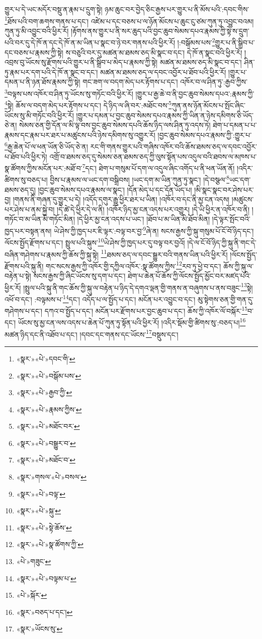 གྱུར་པ་དེ་ཡང་མདོར་བསྡུ་ན་རྣམ་པ་དྲུག་སྟེ། ཉམ་ཆུང་བར་བྱེད་ཅིང་རྒྱས་པར་གྱུར་པ་ནི་མོས་པའི་:དབང་གིས་\footnote{«སྣར་»«པེ་»དབང་གི་}ཐོས་པའི་བག་ཆགས་གནས་པ་དང་། འཛེམ་པ་དང་བཅས་པ་ལ་ཉོན་མོངས་པ་ཆུང་ངུ་ཙམ་ཀུན་ཏུ་འབྱུང་བའམ། ཀུན་ཏུ་མི་འབྱུང་བའི་ཕྱིར་རོ། །རྟོགས་ནས་གྱུར་པ་ནི་སར་ཆུད་པའི་བྱང་ཆུབ་སེམས་དཔའ་རྣམས་ཀྱི་སྟེ་ས་དྲུག་པའི་བར་དུ་དེ་ཁོ་ན་དང་དེ་ཁོ་ན་མ་ཡིན་པ་སྣང་བ་ཉེ་བར་གནས་པའི་ཕྱིར་རོ། །:བསྒོམས་པས་\footnote{«སྣར་»«པེ་»བསྒོམ་པས་}གྱུར་པ་ནི་སྒྲིབ་པ་དང་བཅས་པ་རྣམས་ཀྱི་སྟེ། ས་བཅུའི་བར་དུ་མཚན་མ་ཐམས་ཅད་མི་སྣང་བ་དང་། དེ་ཁོ་ན་སྣང་བའི་ཕྱིར་རོ། །འབྲས་བུ་ཡོངས་སུ་རྫོགས་པའི་གྱུར་པ་ནི་སྒྲིབ་པ་མེད་པ་རྣམས་ཀྱི་སྟེ། མཚན་མ་ཐམས་ཅད་མི་སྣང་བ་དང་། ཤིན་ཏུ་རྣམ་པར་དག་པའི་དེ་ཁོ་ན་སྣང་བ་དང་། མཚན་མ་ཐམས་ཅད་ལ་དབང་འབྱོར་པ་ཐོབ་པའི་ཕྱིར་རོ། །གྱུར་པ་དམན་པ་ནི་ཉན་ཐོས་རྣམས་ཀྱི་སྟེ། གང་ཟག་ལ་བདག་མེད་པར་རྟོགས་པ་དང་། འཁོར་བ་ལ་ཤིན་ཏུ་:རྒྱབ་ཀྱིས་\footnote{«སྣར་»«པེ་»རྒྱབ་ཀྱི་}བལྟས་པས་འཁོར་བ་ཤིན་ཏུ་ཡོངས་སུ་གཏོང་བའི་ཕྱིར་རོ། །གྱུར་པ་རྒྱ་ཆེ་བ་ནི་བྱང་ཆུབ་སེམས་དཔའ་:རྣམས་ཀྱི་\footnote{«སྣར་»«པེ་»རྣམས་ཀྱིས་}སྟེ། ཆོས་ལ་བདག་མེད་པར་རྟོགས་པ་དང་། དེ་ཉིད་ལ་ཞི་བར་:མཐོང་བས་\footnote{«སྣར་»«པེ་»མཐོང་བར་}ཀུན་ནས་ཉོན་མོངས་པ་སྤོང་ཞིང་ཡོངས་སུ་མི་གཏོང་བའི་ཕྱིར་རོ། །གྱུར་པ་དམན་པ་བྱང་ཆུབ་སེམས་དཔའ་རྣམས་ཀྱི་ཡིན་ན་ཉེས་དམིགས་ཅི་ཡོད་ཅེ་ན། སེམས་ཅན་གྱི་དོན་ལ་མི་ལྟ་བས་བྱང་ཆུབ་སེམས་དཔའི་ཆོས་ཉིད་ལས་ཤིན་ཏུ་འདས་ཏེ། ཐེག་པ་དམན་པ་པ་རྣམས་དང་རྣམ་པར་ཐར་པ་མཚུངས་པའི་ཉེས་དམིགས་སུ་འགྱུར་རོ། །བྱང་ཆུབ་སེམས་དཔའ་རྣམས་ཀྱི་:གྱུར་པ་\footnote{«སྣར་»«པེ་»བསྒྱུར་བ་}རྒྱ་ཆེན་པོ་ལ་ཕན་ཡོན་ཅི་ཡོད་ཅེ་ན། རང་གི་གནས་གྱུར་པའི་གཞིས་འཁོར་བའི་ཆོས་ཐམས་ཅད་ལ་དབང་འབྱོར་པ་ཐོབ་པའི་ཕྱིར་ཏེ། འགྲོ་བ་ཐམས་ཅད་དུ་སེམས་ཅན་ཐམས་ཅད་ཀྱི་ལུས་སྟོན་པས་འདུལ་བའི་ཐབས་ལ་མཁས་པ་སྣ་ཚོགས་ཀྱིས་མངོན་པར་:མཐོ་བ་\footnote{«སྣར་»«པེ་»མཐོང་བ་}དང་། ཐེག་པ་གསུམ་པོ་དག་ལ་འདུལ་ཞིང་འགོད་པ་ནི་ཕན་ཡོན་ནོ། །འདིར་ཚིགས་སུ་བཅད་པ། བྱིས་པ་རྣམས་ལ་ཡང་དག་བསྒྲིབས། །ཡང་དག་མ་ཡིན་ཀུན་ཏུ་སྣང་། །དེ་བསྩལ་\footnote{«སྣར་»གསལ་«པེ་»བསལ་}ཡང་དག་ཐམས་ཅད་དུ། །བྱང་ཆུབ་སེམས་དཔའ་རྣམས་ལ་སྣང་། །དོན་མེད་པ་དང་དོན་ཡོད་པ། །མི་སྣང་སྣང་བར་ཤེས་པར་བྱ། །གནས་ནི་གཞན་དུ་གྱུར་པ་དེ། །འདོད་དགུར་རྒྱུ་ཕྱིར་ཐར་པ་ཡིན། །འཁོར་བ་དང་ནི་མྱ་ངན་འདས། །མཚུངས་པར་ཤེས་པ་ནམ་སྐྱེ་བ། །དེ་ཚེ་དེ་ཕྱིར་དེ་ལ་ནི། །འཁོར་ཉིད་མྱ་ངན་འདས་པར་འགྱུར། །དེ་ཡི་ཕྱིར་ན་འཁོར་བ་ནི། །གཏོང་བ་མ་ཡིན་མི་གཏོང་མིན། །དེ་ཕྱིར་མྱ་ངན་འདས་པ་ཡང་། །ཐོབ་པ་མ་ཡིན་མི་ཐོབ་མིན། །དེ་ལྟར་སྤོང་བའི་ཁྱད་པར་བསྟན་ནས། ཡེ་ཤེས་ཀྱི་ཁྱད་པར་ཇི་ལྟར་:བལྟ་བར་བྱ་\footnote{«སྣར་»«པེ་»བལྟ་}ཞེ་ན། སངས་རྒྱས་ཀྱི་སྐུ་གསུམ་པོ་ངོ་བོ་ཉིད་དང་། ལོངས་སྤྱོད་རྫོགས་པ་དང་། སྤྲུལ་པའི་སྐུས་\footnote{«སྣར་»«པེ་»སྐུ་}ཡེ་ཤེས་ཀྱི་ཁྱད་པར་དུ་བལྟ་བར་བྱའོ། །དེ་ལ་ངོ་བོ་ཉིད་ཀྱི་སྐུ་ནི་གང་དེ་བཞིན་གཤེགས་པ་རྣམས་ཀྱི་ཆོས་ཀྱི་སྐུ་སྟེ། \footnote{«སྣར་»«པེ་»སྟེ་ཆོས་}ཐམས་ཅད་ལ་དབང་སྒྱུར་བའི་གནས་ཡིན་པའི་ཕྱིར་རོ། །ལོངས་སྤྱོད་རྫོགས་པའི་སྐུ་ནི། གང་སངས་རྒྱས་ཀྱི་འཁོར་གྱི་དཀྱིལ་འཁོར་:སྣ་ཚོགས་ཀྱིས་\footnote{«སྣར་»«པེ་»སྣ་ཚོགས་ཀྱི་}རབ་ཏུ་ཕྱེ་བ་དང་། ཆོས་ཀྱི་སྐུ་ལ་བརྟེན་པ་སྟེ། སངས་རྒྱས་ཀྱི་ཞིང་ཡོངས་སུ་དག་པ་དང་། ཐེག་པ་ཆེན་པོ་ཆོས་ཀྱི་ལོངས་སྤྱོད་མྱོང་བར་མཛད་པའི་ཕྱིར་རོ། །སྤྲུལ་པའི་སྐུ་ནི་གང་ཆོས་ཀྱི་སྐུ་ལ་བརྟེན་པ་ཉིད་དེ་དགའ་ལྡན་གྱི་གནས་ན་བཞུགས་པ་ནས་བཟུང་\footnote{«པེ་»གཟུང་}སྟེ། འཕོ་བ་དང་། :བལྟམས་པ་\footnote{«སྣར་»«པེ་»བལྟམ་པ་}དང་། འདོད་པ་ལ་སྤྱོད་པ་དང་། མངོན་པར་འབྱུང་བ་དང་། མུ་སྟེགས་ཅན་གྱི་གན་དུ་གཤེགས་པ་དང་། དཀའ་བ་སྤྱོད་པ་དང་། མངོན་པར་རྫོགས་པར་བྱང་ཆུབ་པ་དང་། ཆོས་ཀྱི་འཁོར་ལོ་བསྐོར་\footnote{«པེ་»སྐོར་}བ་དང་། ཡོངས་སུ་མྱ་ངན་ལས་འདས་པ་ཆེན་པོ་ཀུན་ཏུ་སྟོན་པའི་ཕྱིར་རོ། །འདིར་སྡོམ་གྱི་ཚིགས་སུ་:བཅད་པ།\footnote{«སྣར་»བཅད་པ་དང་།} མཚན་ཉིད་དང་ནི་འཐོབ་པ་དང་། །དབང་དང་གནས་དང་ཡོངས་\footnote{«སྣར་»ཡོངས་སུ་}བསྡུས་དང་། 